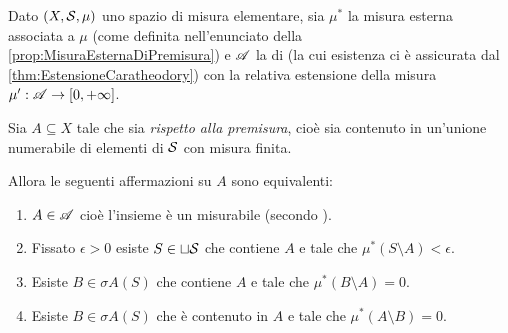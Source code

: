 \begin{theorem}\label{thm:EquivalenzeMisurabilitaSottoinsieme}
	Dato $(X,\S,\mu)$ uno spazio di misura elementare, sia $\mu^*$ la misura esterna associata a $\mu$ (come definita nell'enunciato della \cref{prop:MisuraEsternaDiPremisura}) e $\A$ la \sigalg{} di \carat{} (la cui esistenza ci è assicurata dal \cref{thm:EstensioneCaratheodory}) con la relativa estensione della misura $\mu':\A\to\Rpiu$.
	
	Sia $A\subseteq X$ tale che sia \emph{\sigfin[o] rispetto alla premisura}, cioè sia contenuto in un'unione numerabile di elementi di $\S$ con misura finita.
	
	Allora le seguenti affermazioni su $A$ sono equivalenti:
	\begin{enumerate}[label=(\arabic*),ref=(\arabic*)]
		\item $A\in\A$ cioè l'insieme è un misurabile (secondo \carat{}).\label{it:MisurabileEquivalenze}
		\item Fissato $\epsilon>0$ esiste $S\in\sqcup\S$ che contiene $A$ e tale che $\mu^*(S\setminus A)<\epsilon$.\label{it:UnioniDaFuoriEquivalenze}
		\item Esiste $B\in\sigma A(S)$ che contiene $A$ e tale che $\mu^*(B\setminus A)=0$.\label{it:SigmaDaFuoriEquivalenze}
		\item Esiste $B\in\sigma A(S)$ che è contenuto in $A$ e tale che $\mu^*(A\setminus B)=0$.\label{it:SigmaDaDentroEquivalenze}
	\end{enumerate}
\end{theorem}
